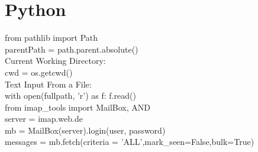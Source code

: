\chapter{Python}\label{chap:Python}
from pathlib import Path\\
parentPath = path.parent.absolute()\\
Current Working Directory:\\
cwd = os.getcwd()\\
Text Input From a File:\\
with open(fullpath, 'r') as f:
f.read()\\

from imap_tools import MailBox, AND\\
server = imap.web.de\\
mb = MailBox(server).login(user, password)\\
messages = mb.fetch(criteria = 'ALL',mark_seen=False,bulk=True)